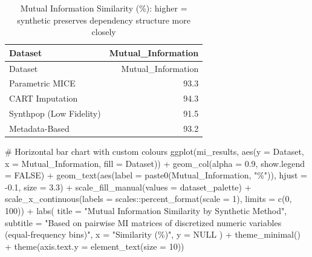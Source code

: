 \documentclass[
  letterpaper,
  DIV=11,
  numbers=noendperiod]{scrartcl}
\newenvironment{Shaded}{\begin{snugshade}}{\end{snugshade}}
\newcommand{\AttributeTok}[1]{\textcolor[rgb]{0.40,0.45,0.13}{#1}}
\newcommand{\CommentTok}[1]{\textcolor[rgb]{0.37,0.37,0.37}{#1}}
\newcommand{\ConstantTok}[1]{\textcolor[rgb]{0.56,0.35,0.01}{#1}}
\newcommand{\DecValTok}[1]{\textcolor[rgb]{0.68,0.00,0.00}{#1}}
\newcommand{\FloatTok}[1]{\textcolor[rgb]{0.68,0.00,0.00}{#1}}
\newcommand{\FunctionTok}[1]{\textcolor[rgb]{0.28,0.35,0.67}{#1}}
\newcommand{\NormalTok}[1]{\textcolor[rgb]{0.00,0.23,0.31}{#1}}
\newcommand{\SpecialCharTok}[1]{\textcolor[rgb]{0.37,0.37,0.37}{#1}}
\newcommand{\StringTok}[1]{\textcolor[rgb]{0.13,0.47,0.30}{#1}}
\begin{document}
\begin{longtable}[]{@{}lr@{}}
\caption{Mutual Information Similarity (\%): higher = synthetic
preserves dependency structure more closely}\tabularnewline
\toprule\noalign{}
Dataset & Mutual\_Information \\
\midrule\noalign{}
\endfirsthead
\toprule\noalign{}
Dataset & Mutual\_Information \\
\midrule\noalign{}
\endhead
\bottomrule\noalign{}
\endlastfoot
Parametric MICE & 93.3 \\
CART Imputation & 94.3 \\
Synthpop (Low Fidelity) & 91.5 \\
Metadata-Based & 93.2 \\
\end{longtable}

\begin{Shaded}
\begin{Highlighting}[]
\CommentTok{\# Horizontal bar chart with custom colours}
\FunctionTok{ggplot}\NormalTok{(mi\_results, }\FunctionTok{aes}\NormalTok{(}\AttributeTok{y =}\NormalTok{ Dataset, }\AttributeTok{x =}\NormalTok{ Mutual\_Information, }\AttributeTok{fill =}\NormalTok{ Dataset)) }\SpecialCharTok{+}
  \FunctionTok{geom\_col}\NormalTok{(}\AttributeTok{alpha =} \FloatTok{0.9}\NormalTok{, }\AttributeTok{show.legend =} \ConstantTok{FALSE}\NormalTok{) }\SpecialCharTok{+}
  \FunctionTok{geom\_text}\NormalTok{(}\FunctionTok{aes}\NormalTok{(}\AttributeTok{label =} \FunctionTok{paste0}\NormalTok{(Mutual\_Information, }\StringTok{"\%"}\NormalTok{)), }
            \AttributeTok{hjust =} \SpecialCharTok{{-}}\FloatTok{0.1}\NormalTok{, }\AttributeTok{size =} \FloatTok{3.3}\NormalTok{) }\SpecialCharTok{+}
  \FunctionTok{scale\_fill\_manual}\NormalTok{(}\AttributeTok{values =}\NormalTok{ dataset\_palette) }\SpecialCharTok{+}
  \FunctionTok{scale\_x\_continuous}\NormalTok{(}\AttributeTok{labels =}\NormalTok{ scales}\SpecialCharTok{::}\FunctionTok{percent\_format}\NormalTok{(}\AttributeTok{scale =} \DecValTok{1}\NormalTok{), }\AttributeTok{limits =} \FunctionTok{c}\NormalTok{(}\DecValTok{0}\NormalTok{, }\DecValTok{100}\NormalTok{)) }\SpecialCharTok{+}
  \FunctionTok{labs}\NormalTok{(}
    \AttributeTok{title =} \StringTok{"Mutual Information Similarity by Synthetic Method"}\NormalTok{,}
    \AttributeTok{subtitle =} \StringTok{"Based on pairwise MI matrices of discretized numeric variables (equal{-}frequency bins)"}\NormalTok{,}
    \AttributeTok{x =} \StringTok{"Similarity (\%)"}\NormalTok{, }\AttributeTok{y =} \ConstantTok{NULL}
\NormalTok{  ) }\SpecialCharTok{+}
  \FunctionTok{theme\_minimal}\NormalTok{() }\SpecialCharTok{+}
  \FunctionTok{theme}\NormalTok{(}\AttributeTok{axis.text.y =} \FunctionTok{element\_text}\NormalTok{(}\AttributeTok{size =} \DecValTok{10}\NormalTok{))}
\end{Highlighting}
\end{Shaded}
\end{document}
